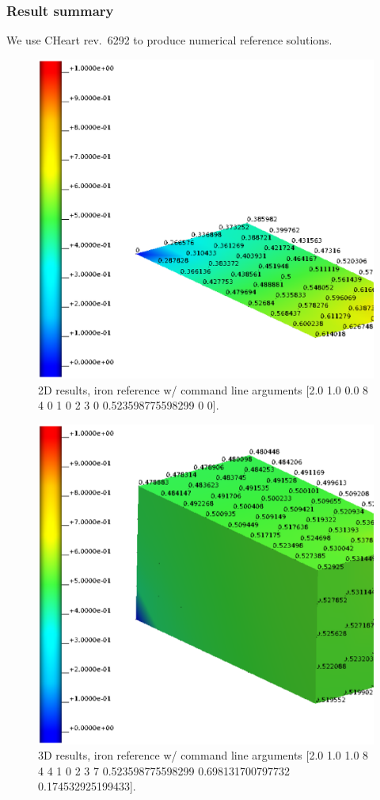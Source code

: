 \subsubsection{Result summary}
%
We use CHeart rev.\ 6292 to produce numerical reference solutions.
%


%
\begin{figure}[h!]
    \centering 
    \includegraphics[width=0.9\columnwidth]{examples/example-0013/doc/figures/iron_reference_2D.eps} 
    \caption{2D results, iron reference w/ command line arguments [2.0 1.0 0.0 8 4 0 1 0 2 3 0 0.523598775598299 0 0].}
    \label{example-0013-iron-2D-reference-fig}
\end{figure}
%
\begin{figure}[h!]
    \centering 
    \includegraphics[width=0.9\columnwidth]{examples/example-0013/doc/figures/iron_reference_3D.eps} 
    \caption{3D results, iron reference w/ command line arguments [2.0 1.0 1.0 8 4 4 1 0 2 3 7 0.523598775598299 0.698131700797732 0.174532925199433].}
    \label{example-0013-iron-3D-reference-fig}
\end{figure}
%
%
